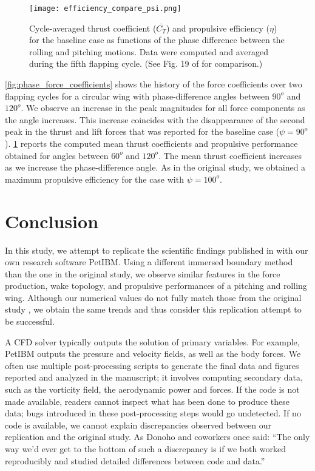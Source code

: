 \begin{figure}[!h]
  \centering
  \texttt{[image: efficiency\_compare\_psi.png]}
  \caption{Cycle-averaged thrust coefficient ($\overline{C_T}$) and propulsive efficiency ($\eta$) for the baseline case as functions of the phase difference between the rolling and pitching motions. Data were computed and averaged during the fifth flapping cycle. (See Fig. 19 of \citet{li_dong_2016} for comparison.)}
  \label{fig:phase_efficiency}
\end{figure}

\cref{fig:phase_force_coefficients} shows the history of the force coefficients over two flapping cycles for a circular wing with phase-difference angles between $90^o$ and $120^o$.
We observe an increase in the peak magnitudes for all force components as the angle increases.
This increase coincides with the disappearance of the second peak in the thrust and lift forces that was reported for the baseline case ($\psi = 90^o$).
\cref{fig:phase_efficiency} reports the computed mean thrust coefficients and propulsive performance obtained for angles between $60^o$ and $120^o$.
The mean thrust coefficient increases as we increase the phase-difference angle.
As in the original study, we obtained a maximum propulsive efficiency for the case with $\psi = 100^o$.

\section{Conclusion}

In this study, we attempt to replicate the scientific findings published in \citet{li_dong_2016} with our own research software PetIBM\supercite{chuang_et_al_2018}.
Using a different immersed boundary method than the one in the original study, we observe similar features in the force production, wake topology, and propulsive performances of a pitching and rolling wing.
Although our numerical values do not fully match those from the original study \citet{li_dong_2016}, we obtain the same trends and thus consider this replication attempt to be successful.

A CFD solver typically outputs the solution of primary variables.
For example, PetIBM outputs the pressure and velocity fields, as well as the body forces.
We often use multiple post-processing scripts to generate the final data and figures reported and analyzed in the manuscript; it involves computing secondary data, such as the vorticity field, the aerodynamic power and forces.
If the code is not made available, readers cannot inspect what has been done to produce these data; bugs introduced in these post-processing steps would go undetected.
If no code is available, we cannot explain discrepancies observed between our replication and the original study.
As Donoho and coworkers \citet{donoho_et_al_2008} once said: ``The only way we'd ever get to the bottom of such a discrepancy is if we both worked reproducibly and studied detailed differences between code and data.''

